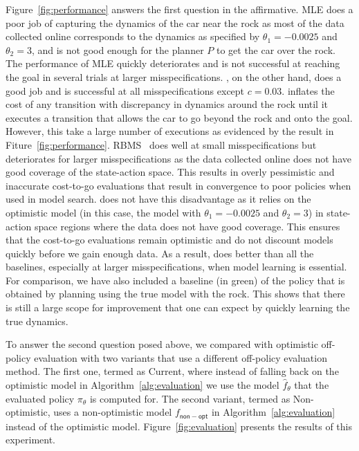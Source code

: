 Figure~\ref{fig:performance} answers the first question in the
affirmative. MLE does a poor job of capturing the dynamics of the car
near the rock as most of the data collected online corresponds to the
dynamics as specified by $\theta_1 = -0.0025$ and $\theta_2 = 3$, and
is not good enough for the planner $P$ to get the car over the
rock. The performance of MLE quickly deteriorates and is not
successful at reaching the goal in several trials at larger
misspecifications. \cmax{},
on the other hand, does a good job and is successful at all
misspecifications except $c = 0.03$. \cmax{} inflates the cost of any
transition with discrepancy in dynamics around the rock until it
executes a transition that allows the car to go beyond the rock and
onto the goal. However, this take a large number of executions as
evidenced by the result in
Fiture~\ref{fig:performance}. RBMS~\cite{DBLP:conf/icra/JosephGRHR13}
does well at small misspecifications but deteriorates for larger
misspecifications as the data collected online does not have good
coverage of the state-action space. This results in overly pessimistic
and inaccurate cost-to-go evaluations that result in convergence to
poor policies when used in model search. \taml{} does not have this
disadvantage as it relies on the optimistic model (in this case, the
model with $\theta_1 = -0.0025$ and $\theta_2 = 3$) in state-action
space regions where the data does not have good coverage. This ensures
that the cost-to-go evaluations remain optimistic and do not discount
models quickly before we gain enough data. As a result, \taml{} does
better than all the baselines, especially at larger misspecifications,
when model learning is essential. For comparison, we have also
included a baseline (in green) of the policy that is obtained by
planning using the true model with the rock. This shows that there is
still a large scope for improvement that one can expect by quickly
learning the true dynamics.

To answer the second question posed above, we compared \taml{} with
optimistic off-policy evaluation with two variants that use a
different off-policy evaluation method. The first one, termed as
\taml{} Current, where instead of falling back on the optimistic model
in Algorithm~\ref{alg:evaluation} we use the model $\hat{f}_\theta$
that the evaluated policy $\pi_\theta$ is computed for. The second
variant, termed as \taml{} Non-optimistic, uses a non-optimistic model
$f_{\mathsf{non-opt}}$ in Algorithm~\ref{alg:evaluation} instead of the
optimistic model. Figure~\ref{fig:evaluation} presents the results of
this experiment.

